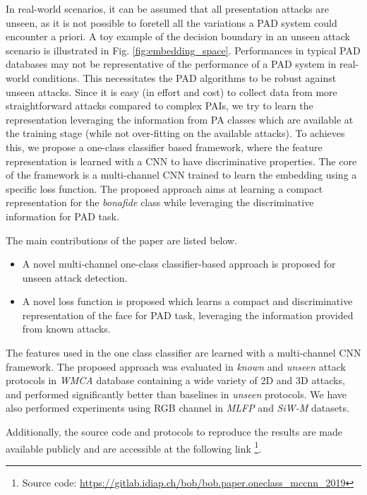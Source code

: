 \documentclass[journal]{IEEEtran}
\begin{document}
In real-world scenarios, it can be assumed that all presentation attacks are unseen, as it is not possible to foretell all the variations a PAD system could encounter a priori. A toy example of the decision boundary in an unseen attack scenario is illustrated in Fig. \ref{fig:embedding_space}. Performances in typical PAD databases may not be representative of the performance of a PAD system in real-world conditions. This necessitates the PAD algorithms to be robust against unseen attacks. Since it is easy  (in effort and cost) to collect data from more straightforward attacks compared to complex PAIs, we try to learn the representation leveraging the information from PA classes which are available at the training stage (while not over-fitting on the available attacks). To achieves this, we propose a one-class classifier based framework, where the feature representation is learned with a CNN to have discriminative properties. The core of the framework is a multi-channel CNN trained to learn the embedding using a specific loss function. The proposed approach aims at learning a compact representation for the \textit{bonafide} class while leveraging the discriminative information for PAD task.

The main contributions of the paper are listed below.

\begin{itemize}
  \item A novel multi-channel one-class classifier-based approach is proposed for unseen attack detection.
  \item A novel loss function is proposed which learns a compact and discriminative representation of the face for PAD task, leveraging the information provided from known attacks.

\end{itemize}

The features used in the one class classifier are learned with a multi-channel CNN framework. The proposed approach was evaluated in \textit{known} and \textit{unseen} attack protocols in \textit{WMCA} database containing a wide variety of 2D and 3D attacks, and performed significantly better than baselines in \textit{unseen} protocols. We have also performed experiments using RGB channel in \textit{MLFP} and \textit{SiW-M} datasets.

Additionally, the source code and protocols to reproduce the results are made available publicly and are accessible at the following link \footnote{Source code: \url{https://gitlab.idiap.ch/bob/bob.paper.oneclass_mccnn_2019}}.
\end{document}
